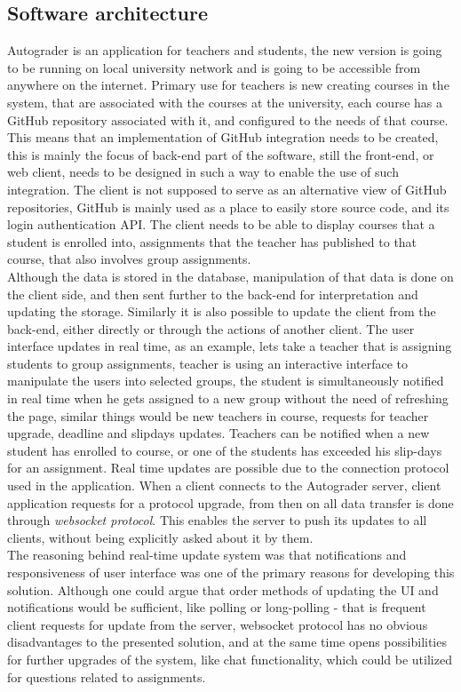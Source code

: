 \subsection{Software architecture}
Autograder is an application for teachers and students, the new version is going to be running on local university network and is going to be accessible from anywhere on the internet. Primary use for teachers is new creating courses in the system, that are associated with the courses at the university, each course has a GitHub repository associated with it, and configured to the needs of that course. This means that an implementation of GitHub integration needs to be created, this is mainly the focus of back-end part of the software, still the front-end, or web client, needs to be designed in such a way to enable the
 use of such integration. The client is not supposed to serve as an alternative view of GitHub repositories, GitHub is mainly used as a place to easily store source code, and its login authentication API. The client needs to be able to display courses that a student is enrolled into, assignments that the teacher has published to that course, that also involves group assignments.
\\Although the data is stored in the database, manipulation of that data is done on the client side, and then sent further to the back-end for interpretation and updating the storage. Similarly it is also possible to update the client from the back-end, either directly or through the actions of another client. The user interface updates in real time, as an example, lets take a teacher that is assigning students to group assignments, teacher is using an interactive interface to manipulate the users into selected groups, the student is simultaneously notified in real time when he gets assigned to a new group without the need of refreshing the page, similar things would be new teachers in course, requests for teacher upgrade, deadline and slipdays updates. Teachers can be notified when a new student has enrolled to course, or one of the students has exceeded his slip-days for an assignment. Real time updates are possible due to the connection protocol used in the application. When a client connects to the Autograder server, client application requests for a protocol upgrade, from then on all data transfer is done through \emph{websocket protocol}\cite{websocket}. This enables the server to push its updates to all clients, without being explicitly asked about it by them.
\\The reasoning behind real-time update system was that notifications and responsiveness of user interface was one of the primary reasons for developing this solution. Although one could argue that order methods of updating the UI and notifications would be sufficient, like polling or long-polling - that is frequent client requests for update from the server, websocket protocol has no obvious disadvantages to the presented solution, and at the same time opens possibilities for further upgrades of the system, like chat functionality, which could be utilized for questions related to assignments.
